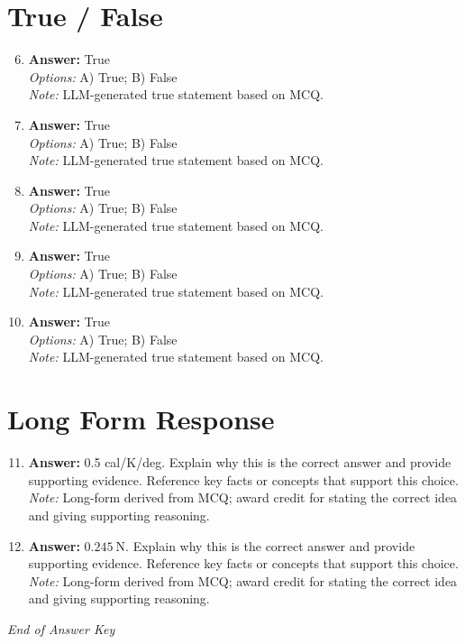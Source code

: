\documentclass[12pt]{article}
\begin{document}
\section*{True / False}
\begin{enumerate}[label=\arabic*.]
\setcounter{enumi}{5}
\item \textbf{Answer:} True
\\ \textit{Options:} A) True; B) False
\\ \textit{Note:} LLM-generated true statement based on MCQ.
\item \textbf{Answer:} True
\\ \textit{Options:} A) True; B) False
\\ \textit{Note:} LLM-generated true statement based on MCQ.
\item \textbf{Answer:} True
\\ \textit{Options:} A) True; B) False
\\ \textit{Note:} LLM-generated true statement based on MCQ.
\item \textbf{Answer:} True
\\ \textit{Options:} A) True; B) False
\\ \textit{Note:} LLM-generated true statement based on MCQ.
\item \textbf{Answer:} True
\\ \textit{Options:} A) True; B) False
\\ \textit{Note:} LLM-generated true statement based on MCQ.
\end{enumerate}

\section*{Long Form Response}
\begin{enumerate}[label=\arabic*.]
\setcounter{enumi}{10}
\item \textbf{Answer:} 0.5 cal/K/deg. Explain why this is the correct answer and provide supporting evidence. Reference key facts or concepts that support this choice.
\\ \textit{Note:} Long-form derived from MCQ; award credit for stating the correct idea and giving supporting reasoning.
\item \textbf{Answer:} $0.245$$\mathrm{~N}$. Explain why this is the correct answer and provide supporting evidence. Reference key facts or concepts that support this choice.
\\ \textit{Note:} Long-form derived from MCQ; award credit for stating the correct idea and giving supporting reasoning.
\end{enumerate}

\vfill
\noindent\textit{End of Answer Key}
\end{document}
